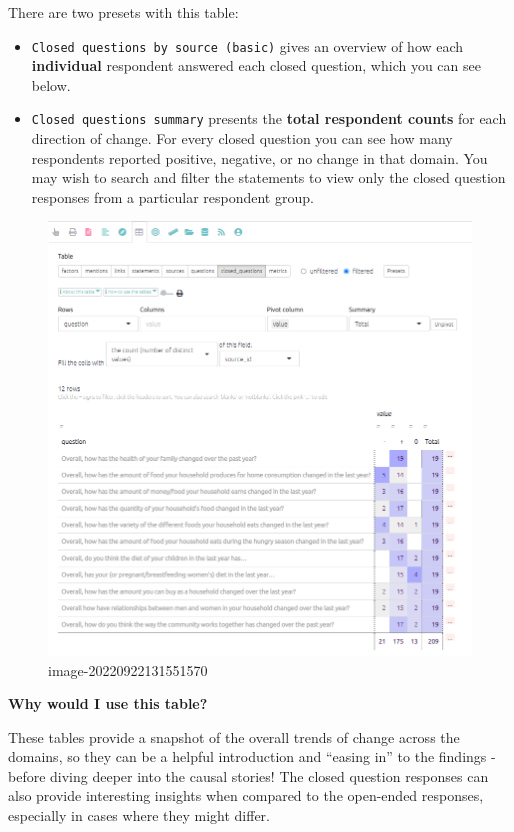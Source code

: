 \documentclass[
]{book}
\providecommand{\tightlist}{%
  \setlength{\itemsep}{0pt}\setlength{\parskip}{0pt}}
\begin{document}
There are two presets with this table:

\begin{itemize}
\tightlist
\item
  \texttt{Closed\ questions\ by\ source\ (basic)} gives an overview of how each \textbf{individual} respondent answered each closed question, which you can see below.
\item
  \texttt{Closed\ questions\ summary} presents the \textbf{total respondent counts} for each direction of change. For every closed question you can see how many respondents reported positive, negative, or no change in that domain. You may wish to search and filter the statements to view only the closed question responses from a particular respondent group.
\end{itemize}

\begin{figure}
\centering
\includegraphics[width=6.77083in,height=\textheight]{_assets/image-20220922131551570.png}
\caption{image-20220922131551570}
\end{figure}

\textbf{Why would I use this table?}

These tables provide a snapshot of the overall trends of change across the domains, so they can be a helpful introduction and ``easing in'' to the findings - before diving deeper into the causal stories! The closed question responses can also provide interesting insights when compared to the open-ended responses, especially in cases where they might differ.
\end{document}
